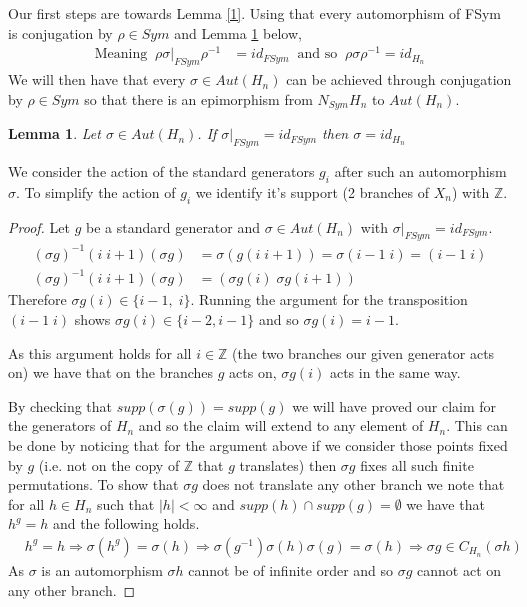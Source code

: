 \documentclass[a4paper,10pt]{article}
\newcommand{\Z}{\mathbb{Z}}
\theoremstyle{plain}%
\newtheorem{lem}[thm]{Lemma}
\theoremstyle{definition}
\theoremstyle{remark}
\begin{document}
Our first steps are towards Lemma \ref{1}. Using that every automorphism  of FSym is conjugation by $\rho \in Sym$ and Lemma \ref{3} below,
\bigskip
\bigskip
\bigskip
\bigskip
\bigskip
\begin{align*}   \textrm{Meaning} \;\;  \rho \sigma |_{FSym} \rho^{-1} &=id_{FSym}\;\; \textrm{and so}\;\; \rho \sigma \rho^{-1} = id_{H_n}
     \end{align*}
We will then have that every $\sigma \in Aut(H_n)$ can be achieved through conjugation by $\rho \in Sym$ so that there is an epimorphism from $N_{Sym}H_n$ to $Aut(H_n)$.
\begin{lem}\label{3} Let $\sigma \in Aut(H_n)$. If $\sigma |_{FSym}=id_{FSym}$ then $\sigma=id_{H_n}$
\end{lem}
We consider the action of the standard generators $g_i$ after such an automorphism $\sigma$. To simplify the action of $g_i$ we identify it's support (2 branches of $X_n$) with $\Z$.
\begin{proof} Let $g$ be a standard generator and $\sigma \in Aut(H_n)$ with $\sigma |_{FSym}=id_{FSym}$.
\begin{align*}(\sigma g)^{-1} (i\; i+1)(\sigma g) &= \sigma(g(i\; i+1))=\sigma(i-1\; i)=(i-1\; i)\\
(\sigma g)^{-1} (i\; i+1)(\sigma g) &=(\sigma g(i) \; \sigma g(i+1))
\end{align*}
Therefore $\sigma g(i) \in \{ i-1,\; i\}$. Running the argument for the transposition $(i-1 \; i)$ shows $\sigma g(i) \in \{i-2, i-1\}$ and so $\sigma g(i) = i-1$.

As this argument holds for all $i \in \Z$ (the two branches our given generator acts on) we have that on the branches $g$ acts on, $\sigma g(i)$ acts in the same way.

By checking that $supp(\sigma (g))=supp(g)$ we will have proved our claim for the generators of $H_n$ and so the claim will extend to any element of $H_n$.
This can be done by noticing that for the argument above if we consider those points fixed by $g$ (i.e. not on the copy of $\Z$ that $g$ translates) then $\sigma g$ fixes all
such finite permutations. To show that $\sigma g$ does not translate any other branch we note that for all $h \in H_n$ such that $|h|<\infty$ and $supp(h) \cap supp(g) = \emptyset$ we have that $h^g = h$ and the following holds.
\begin{align*}
&h^g = h \Rightarrow \sigma(h^g)=\sigma(h) \Rightarrow \sigma(g^{-1})\sigma(h)\sigma(g)=\sigma(h) \Rightarrow \sigma g \in C_{H_n} (\sigma h)
\end{align*}
As $\sigma$ is an automorphism $\sigma h$ cannot be of infinite order and so $\sigma g$ cannot act on any other branch.
\end{proof}
\end{document}
